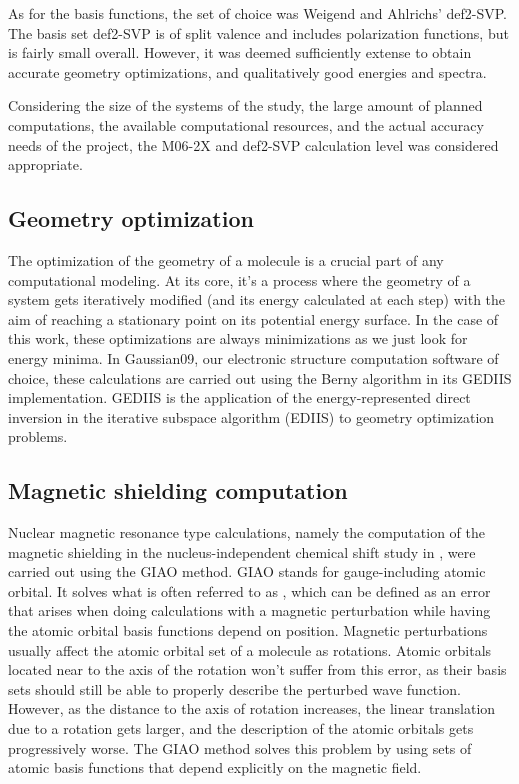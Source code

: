 As for the basis functions, the set of choice was Weigend and Ahlrichs' def2-SVP.
The basis set def2-SVP is of split valence and includes polarization functions, but is fairly small overall.
However, it was deemed sufficiently extense to obtain accurate geometry optimizations, and qualitatively good energies and spectra.

Considering the size of the systems of the study, the large amount of planned computations, the available computational resources, and the actual accuracy needs of the project, the M06-2X and def2-SVP calculation level was considered appropriate.

\subsection{Geometry optimization}
The optimization of the geometry of a molecule is a crucial part of any computational modeling.
At its core, it's a process where the geometry of a system gets iteratively modified (and its energy calculated at each step) with the aim of reaching a stationary point on its potential energy surface.
In the case of this work, these optimizations are always minimizations as we just look for energy minima.
In Gaussian09,\cite{gaussian09} our electronic structure computation software of choice, these calculations are carried out using the Berny algorithm in its GEDIIS implementation.
GEDIIS is the application of the energy-represented direct inversion in the iterative subspace algorithm (EDIIS) to geometry optimization problems.

\subsection{Magnetic shielding computation}
Nuclear magnetic resonance type calculations, namely the computation of the magnetic shielding in the nucleus-independent chemical shift study in , were carried out using the GIAO method.
GIAO stands for gauge-including atomic orbital.
It solves what is often referred to as , which can be defined as an error that arises when doing calculations with a magnetic perturbation while having the atomic orbital basis functions depend on position.
Magnetic perturbations usually affect the atomic orbital set of a molecule as rotations.
Atomic orbitals located near to the axis of the rotation won't suffer from this error, as their basis sets should still be able to properly describe the perturbed wave function.
However, as the distance to the axis of rotation increases, the linear translation due to a rotation gets larger, and the description of the atomic orbitals gets progressively worse.
The GIAO method solves this problem by using sets of atomic basis functions that depend explicitly on the magnetic field.

